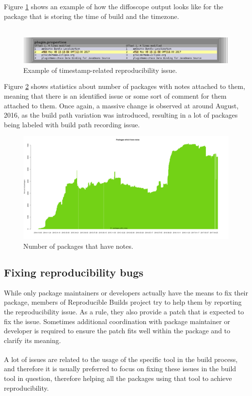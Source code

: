 {Figure \ref{fig:timestamps} shows an example of how the diffoscope output looks like for the package that is storing the time of build and the timezone.\\\\
\FloatBarrier

\begin{figure}[h]
\centering
\includegraphics[width=1\textwidth]{fig/timestamp.png}
\caption{\label{fig:timestamps}Example of timestamp-related reproducibility issue.}
\end{figure}

Figure \ref{fig:stats_notes} shows statistics about number of packages with notes attached to them, meaning that there is an identified issue or some sort of comment for them attached to them. Once again, a massive change is observed at around August, 2016, as the build path variation was introduced, resulting in a lot of packages being labeled with build path recording issue.\\
\FloatBarrier

\begin{figure}[h]
\centering
\includegraphics[width=1.05\textwidth]{fig/stats_notes.png}
\caption{\label{fig:stats_notes}Number of packages that have notes. \autocite{tests-rbo}}
\end{figure}
\subsection[Fixing reproducibility bugs]{Fixing reproducibility bugs}
While only package maintainers or developers actually have the means to fix their package, members of Reproducible Builds project try to help them by reporting the reproducibility issue. As a rule, they also provide a patch that is expected to fix the issue. Sometimes additional coordination with package maintainer or developer is required to ensure the patch fits well within the package and to clarify its meaning.\\\\
A lot of issues are related to the usage of the specific tool in the build process, and therefore it is usually preferred to focus on fixing these issues in the build tool in question, therefore helping all the packages using that tool to achieve reproducibility.

}
